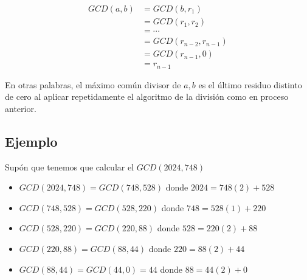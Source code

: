 \documentclass[12pt, fleqn]{report}                             %
\begin{document}
\begin{itemize}
                    \begin{equation*}
                    \begin{split}
                        GCD(a,b)    &= GCD(b,r_1)           \\
                                    &= GCD(r_1,r_2)         \\
                                    &= \cdots               \\
                                    &= GCD(r_{n-2},r_{n-1}) \\
                                    &= GCD(r_{n-1}, 0)      \\
                                    &= r_{n-1} 
                    \end{split}
                    \end{equation*}

            \end{itemize}

            En otras palabras, el máximo común divisor de $a,b$ es el último residuo distinto
            de cero al aplicar repetidamente el algoritmo de la división como en proceso anterior.



        \clearpage
        \subsection{Ejemplo}
            Supón que tenemos que calcular el $GCD(2024, 748)$


            \begin{itemize}
                \item $GCD(2024, 748) = GCD(748, 528)$   donde $2024=748(2)+528$

                \item $GCD(748, 528)  = GCD(528, 220)$   donde $748=528(1)+220$

                \item $GCD(528, 220)  = GCD(220, 88)$    donde $528=220(2)+88$

                \item $GCD(220, 88)   = GCD(88, 44)$     donde $220=88(2)+44$

                \item $GCD(88, 44)    = GCD(44, 0) = 44$ donde $88=44(2)+0$
            \end{itemize}
\end{document}
